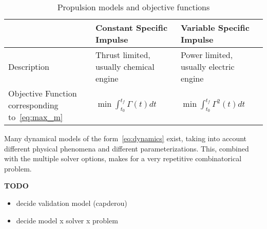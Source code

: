 \begin{table}[]
    \centering
    \begin{tabular}{p{5cm}p{5cm}p{5cm}} \toprule
        & \textbf{Constant Specific Impulse} & \textbf{Variable Specific Impulse} \\ \midrule
        Description & Thrust limited, usually chemical engine & Power limited, usually electric engine \\
        Objective Function corresponding to~\eqref{eq:max_m} & \(\min \int_{t_0}^{t_f} \Gamma(t) dt\) & \(\min \int_{t_0}^{t_f} \Gamma^2(t) dt\) \\ \bottomrule
    \end{tabular}
    \caption{Propulsion models and objective functions}
    \label{tab:prop_models}
\end{table}

Many dynamical models of the form~\eqref{eq:dynamics} exist, taking into account different physical phenomena and different parameterizations. This, combined with the multiple solver options, makes for a very repetitive combinatorical problem. 

\textbf{TODO}
\begin{itemize}
    \item decide validation model (capderou)
    \item decide model x solver x problem
\end{itemize}